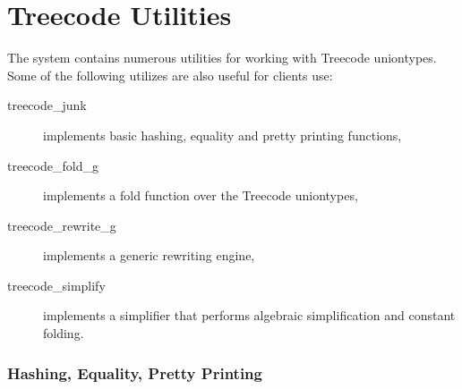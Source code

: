 \section{Treecode Utilities} 

The \LOWHALF{} system contains numerous utilities for working with
Treecode uniontypes.  Some of the following utilizes are also useful for clients
use:
\begin{description}
  \item[treecode_junk] implements basic hashing, equality and pretty
printing functions,
  \item[treecode_fold_g] implements a fold function over the Treecode uniontypes,  
  \item[treecode_rewrite_g] implements a generic rewriting engine,
  \item[treecode_simplify] implements a simplifier that performs algebraic
simplification and constant folding.
\end{description}
\subsubsection{Hashing, Equality, Pretty Printing}

